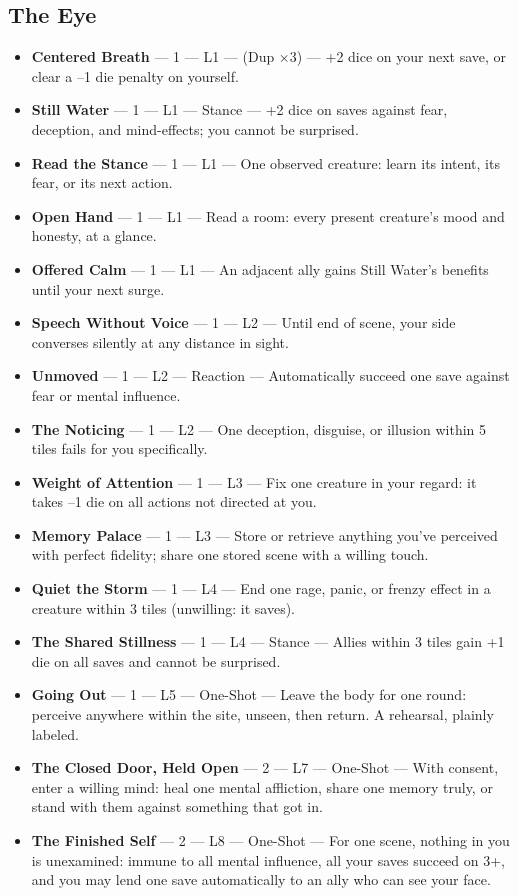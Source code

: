 \subsection{The Eye}
\begin{itemize}
    \item \textbf{Centered Breath} --- 1 --- L1 --- (Dup ×3) --- +2 dice on your next save, or clear a --1 die penalty on yourself.
    \item \textbf{Still Water} --- 1 --- L1 --- Stance --- +2 dice on saves against fear, deception, and mind-effects; you cannot be surprised.
    \item \textbf{Read the Stance} --- 1 --- L1 --- One observed creature: learn its intent, its fear, or its next action.
    \item \textbf{Open Hand} --- 1 --- L1 --- Read a room: every present creature's mood and honesty, at a glance.
    \item \textbf{Offered Calm} --- 1 --- L1 --- An adjacent ally gains Still Water's benefits until your next surge.
    \item \textbf{Speech Without Voice} --- 1 --- L2 --- Until end of scene, your side converses silently at any distance in sight.
    \item \textbf{Unmoved} --- 1 --- L2 --- Reaction --- Automatically succeed one save against fear or mental influence.
    \item \textbf{The Noticing} --- 1 --- L2 --- One deception, disguise, or illusion within 5 tiles fails for you specifically.
    \item \textbf{Weight of Attention} --- 1 --- L3 --- Fix one creature in your regard: it takes --1 die on all actions not directed at you.
    \item \textbf{Memory Palace} --- 1 --- L3 --- Store or retrieve anything you've perceived with perfect fidelity; share one stored scene with a willing touch.
    \item \textbf{Quiet the Storm} --- 1 --- L4 --- End one rage, panic, or frenzy effect in a creature within 3 tiles (unwilling: it saves).
    \item \textbf{The Shared Stillness} --- 1 --- L4 --- Stance --- Allies within 3 tiles gain +1 die on all saves and cannot be surprised.
    \item \textbf{Going Out} --- 1 --- L5 --- One-Shot --- Leave the body for one round: perceive anywhere within the site, unseen, then return. A rehearsal, plainly labeled.
    \item \textbf{The Closed Door, Held Open} --- 2 --- L7 --- One-Shot --- With consent, enter a willing mind: heal one mental affliction, share one memory truly, or stand with them against something that got in.
    \item \textbf{The Finished Self} --- 2 --- L8 --- One-Shot --- For one scene, nothing in you is unexamined: immune to all mental influence, all your saves succeed on 3+, and you may lend one save automatically to an ally who can see your face.
\end{itemize}

